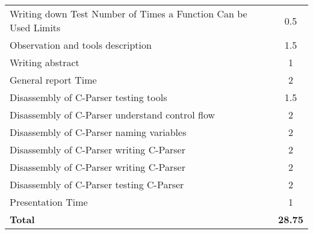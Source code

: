\begin{table}[H]
\begin{tabular*}{\textwidth}{@{\extracolsep{\fill}} l c@{\extracolsep{0pt}} }
	Writing down Test Number of Times a Function Can be Used Limits & 0.5 \\
	Observation and tools description			& 1.5 \\
	Writing abstract							& 1 \\
	General report Time							& 2 \\
	Disassembly of C-Parser testing tools		& 1.5 \\
	Disassembly of C-Parser	understand control flow	& 2 \\
	Disassembly of C-Parser	naming variables	& 2 \\
	Disassembly of C-Parser	writing C-Parser	& 2 \\
	Disassembly of C-Parser	writing C-Parser	& 2 \\
	Disassembly of C-Parser	testing C-Parser	& 2 \\
	Presentation Time 							& 1 \\
\hline\hline
\textbf{Total}									& \textbf{28.75}
\end{tabular*}
\end{table}
\clearpage

